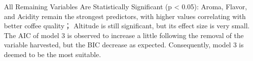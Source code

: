 \documentclass[
  letterpaper,
  DIV=11,
  numbers=noendperiod]{scrartcl}
\newenvironment{Shaded}{\begin{snugshade}}{\end{snugshade}}
\newcommand{\AttributeTok}[1]{\textcolor[rgb]{0.40,0.45,0.13}{#1}}
\newcommand{\CommentTok}[1]{\textcolor[rgb]{0.37,0.37,0.37}{#1}}
\newcommand{\FunctionTok}[1]{\textcolor[rgb]{0.28,0.35,0.67}{#1}}
\newcommand{\NormalTok}[1]{\textcolor[rgb]{0.00,0.23,0.31}{#1}}
\newcommand{\OtherTok}[1]{\textcolor[rgb]{0.00,0.23,0.31}{#1}}
\newcommand{\SpecialCharTok}[1]{\textcolor[rgb]{0.37,0.37,0.37}{#1}}
\newcommand{\StringTok}[1]{\textcolor[rgb]{0.13,0.47,0.30}{#1}}
\begin{document}
All Remaining Variables Are Statistically Significant (p \textless{}
0.05): Aroma, Flavor, and Acidity remain the strongest predictors, with
higher values correlating with better coffee quality； Altitude is still
significant, but its effect size is very small. The AIC of model 3 is
observed to increase a little following the removal of the variable
harvested, but the BIC decrease as expected. Consequently, model 3 is
deemed to be the most suitable.

\begin{Shaded}
\end{Shaded}
\end{document}
